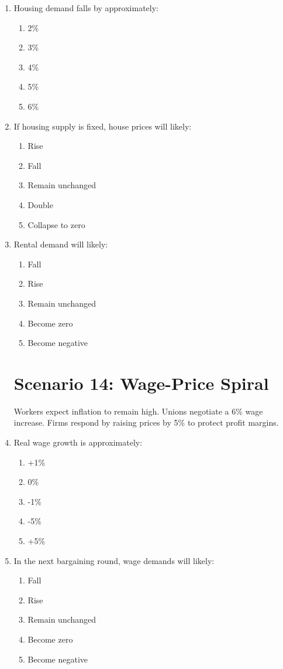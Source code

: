 \documentclass[12pt]{article}
\begin{document}
\begin{enumerate}[label=\textbf{\arabic*.}]
\item Housing demand falls by approximately:
\begin{enumerate}[label=\Alph*.]
\item 2\%
\item 3\%
\item 4\%
\item 5\%
\item 6\%
\end{enumerate}

\item If housing supply is fixed, house prices will likely:
\begin{enumerate}[label=\Alph*.]
\item Rise
\item Fall
\item Remain unchanged
\item Double
\item Collapse to zero
\end{enumerate}
\newpage
\item Rental demand will likely:
\begin{enumerate}[label=\Alph*.]
\item Fall
\item Rise
\item Remain unchanged
\item Become zero
\item Become negative
\end{enumerate}

\section*{Scenario 14: Wage-Price Spiral}

Workers expect inflation to remain high. Unions negotiate a 6\% wage increase. Firms respond by raising prices by 5\% to protect profit margins.

\item Real wage growth is approximately:
\begin{enumerate}[label=\Alph*.]
\item +1\%
\item 0\%
\item -1\%
\item -5\%
\item +5\%
\end{enumerate}

\item In the next bargaining round, wage demands will likely:
\begin{enumerate}[label=\Alph*.]
\item Fall
\item Rise
\item Remain unchanged
\item Become zero
\item Become negative
\end{enumerate}


\end{enumerate}
\end{document}
